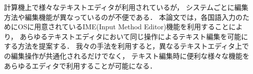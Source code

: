 
\begin{jabstract}
計算機上で様々なテキストエディタが利用されているが，
システムごとに編集方法や編集機能が異なっているのが不便である．
本論文では，各国語入力のためにOSに用意されているIME(Input Method Editor)機能を利用することにより，
あらゆるテキストエディタにおいて同じ操作によるテキスト編集を可能にする方法を提案する．
我々の手法を利用すると，異なるテキストエディタ上での編集操作が共通化されるだけでなく，
テキスト編集時に便利な様々な機能をあらゆるエディタで利用することが可能になる．

\end{jabstract}



